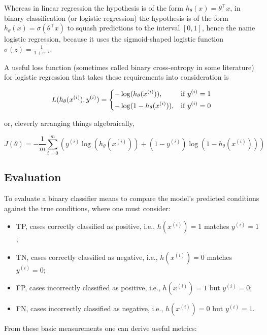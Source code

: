 Whereas in linear regression the hypothesis is of the form $h_{\theta}(x) = \theta^{\top}x$, in binary classification (or logistic regression) the hypothesis is of the form $h_{\theta}(x) = \sigma(\theta^{\top}x)$ to squash predictions to the interval $[0, 1]$, hence the name logistic regression, because it uses the sigmoid-shaped logistic function $\sigma(z) = \frac{1}{1 + e^{-z}}$.

A useful loss function (sometimes called binary cross-entropy in some literature) for logistic regression that takes these requirements into consideration is

$$
L(h_{\theta}(x^{(i)}), y^{(i)}) =
\begin{dcases}
    -\log(h_{\theta}(x^{(i)})),& \text{if } y^{(i)} = 1\\
    -\log(1 - h_{\theta}(x^{(i)})),& \text{if } y^{(i)} = 0
\end{dcases}
$$

or, cleverly arranging things algebraically,

$$
J(\theta) = -\frac{1}{m} \sum_{i=0}^{m} ( y^{(i)}\log(h_{\theta}(x^{(i)})) + (1 - y^{(i)})\log(1 - h_{\theta}(x^{(i)})) )
$$

\subsection{Evaluation}

To evaluate a binary classifier means to compare the model's predicted conditions against the true conditions, where one must consider:

\begin{itemize}
    \item \ac{TP}, cases correctly classified as positive, i.e., $h(x^{(i)}) = 1$ matches $y^{(i)} = 1$;
    \item \ac{TN}, cases correctly classified as negative, i.e., $h(x^{(i)}) = 0$ matches $y^{(i)} = 0$;
    \item \ac{FP}, cases incorrectly classified as positive, i.e., $h(x^{(i)}) = 1$ but $y^{(i)} = 0$;
    \item \ac{FN}, cases incorrectly classified as negative, i.e., $h(x^{(i)}) = 0$ but $y^{(i)} = 1$.
\end{itemize}

From these basic measurements one can derive useful metrics:

